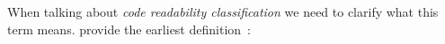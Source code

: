 \documentclass[%
class=scrreprt,
chapterprefix=false,%
open=right,%
twoside=true,%
paper=a4,%
logofile={Logo\_zentral\_farbig\_EN.png},%
thesistype=master,%
UKenglish,%
]{se2thesis}
\theoremstyle{definition}
\begin{document}
	

	
When talking about \textit{code readability classification} we need to clarify what this term means.
\citeauthor{buse2009learning} provide the earliest definition~\cite{buse2009learning}:
	
	

	
\end{document}
